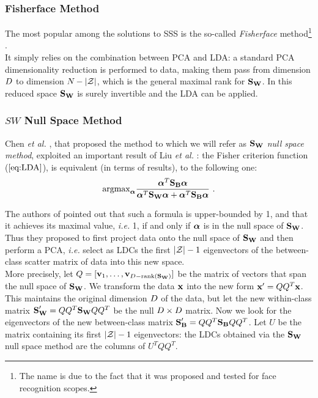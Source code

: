 \subsubsection{Fisherface Method}
The most popular among the solutions to SSS is the so-called {\em Fisherface} method\footnote{The name is due to the fact that it was proposed and tested for face recognition scopes.} \cite{eigenfaces}.\\
It simply relies on the combination between PCA and LDA: a standard PCA dimensionality reduction is performed to data, making them pass from dimension $\traceLength$ to dimension $\numTraces[]-\lvert \sensVarSet \rvert$, which is the general maximal rank for $\SW$. In this reduced space $\SW$ is surely invertible and the LDA can be applied.

\subsubsection{$SW$ Null Space Method}
Chen \textit{et al.} \cite{Chen2000}, that proposed the method to which we will refer as { \em $\SW$ null space method}, exploited an important result of Liu \textit{et al.} \cite{liu1992generalized}: the Fisher criterion function ($\ref{eq:LDA}$), is equivalent (in terms of results), to the following one:
 \begin{equation}
 \mathrm{argmax}_{\AAlpha} \frac{\AAlpha^T \SB \AAlpha}{\AAlpha^T \SW \AAlpha + \AAlpha^T \SB \AAlpha} \mbox{ .}
 \end{equation}

The authors of \cite{Chen2000} pointed out that such a formula is upper-bounded by 1, and that it achieves its maximal value, \textit{i.e.} 1, if and only if  $\AAlpha$ is in the null space of $\SW$. Thus they proposed to first project data onto the null space of $\SW$ and then perform a PCA, \textit{i.e.} select as LDCs the first $\lvert \sensVarSet \rvert - 1$ eigenvectors of the between-class scatter matrix of data into this new space.\\
More precisely, let $Q = [\vvv_1, \dots, \vvv_{\traceLength - \mathrm{rank}(\SW)}]$ be the matrix of vectors that span the null space of $\SW$. We transform the data $\sss[]{}$ into the new form $\xxx' = QQ^T\xxx$. This maintains the original dimension $\traceLength$ of the data, but let the new within-class matrix $\SW' = QQ^T\SW QQ^T$ be the null $\traceLength \times \traceLength$ matrix. Now we look for the eigenvectors of the new between-class matrix $\SB' = QQ^T\SB QQ^T$. Let $U$ be the matrix containing its first $\lvert \sensVarSet \rvert - 1$ eigenvectors: the LDCs obtained via the $\SW$ null space method are the columns of $U^TQQ^T$.

